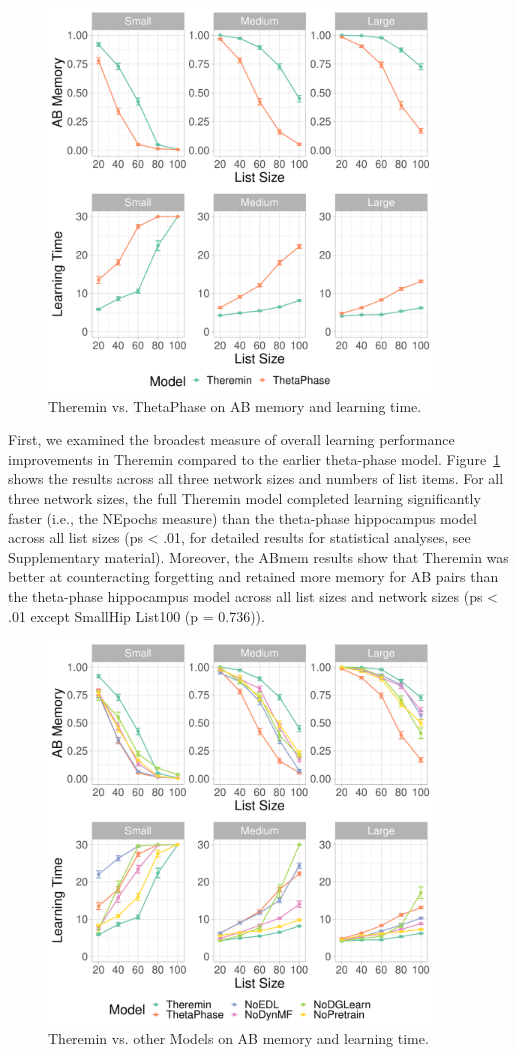 \documentclass[11pt,twoside]{article}
\newif\myifpdf
\begin{document}
\begin{figure}
  \centering\includegraphics[width=4in]{fig_hip_edl_thetaphase}
  \caption{\footnotesize Theremin vs. ThetaPhase on AB memory and learning time.}
\label{fig.thetaphase}
\end{figure}

First, we examined the broadest measure of overall learning performance improvements in Theremin compared to the earlier theta-phase model.  Figure~\ref{fig.thetaphase} shows the results across all three network sizes and numbers of list items.  For all three network sizes, the full Theremin model completed learning significantly faster (i.e., the NEpochs measure) than the theta-phase hippocampus model across all list sizes (ps < .01, for detailed results for statistical analyses, see Supplementary material). Moreover, the ABmem results show that Theremin was better at counteracting forgetting and retained more memory for AB pairs than the theta-phase hippocampus model across all list sizes and network sizes (ps < .01 except SmallHip List100 (p = 0.736)).

\begin{figure}
  \centering\includegraphics[width=4in]{fig_hip_edl_mods}
  \caption{\footnotesize Theremin vs. other Models on AB memory and learning time.}
\label{fig.mods}
\end{figure}
\end{document}
